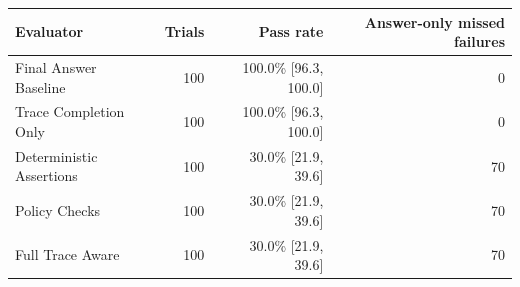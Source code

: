 \begin{tabular}{lrrr}
\toprule
Evaluator & Trials & Pass rate & Answer-only missed failures \\
\midrule
Final Answer Baseline & 100 & 100.0\% [96.3, 100.0] & 0 \\
Trace Completion Only & 100 & 100.0\% [96.3, 100.0] & 0 \\
Deterministic Assertions & 100 & 30.0\% [21.9, 39.6] & 70 \\
Policy Checks & 100 & 30.0\% [21.9, 39.6] & 70 \\
Full Trace Aware & 100 & 30.0\% [21.9, 39.6] & 70 \\
\bottomrule
\end{tabular}
